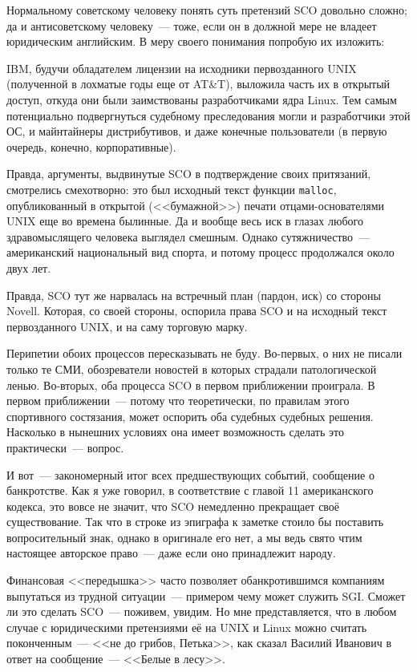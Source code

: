 Нормальному советскому человеку понять суть претензий SCO довольно сложно; да и антисоветскому человеку~--- тоже, если он в должной мере не владеет юридическим английским. В меру своего понимания попробую их изложить:

IBM, будучи обладателем лицензии на исходники первозданного UNIX (полученной в лохматые годы еще от AT\&T), выложила часть их в открытый доступ, откуда они были заимствованы разработчиками ядра Linux. Тем самым потенциально подвергнуться судебному преследования могли и разработчики этой ОС, и майнтайнеры дистрибутивов, и даже конечные пользователи (в первую очередь, конечно, корпоративные).

Правда, аргументы, выдвинутые SCO в подтверждение своих притязаний, смотрелись смехотворно: это был исходный текст функции \texttt{malloc}, опубликованный в открытой (<<бумажной>>) печати отцами-основателями UNIX еще во времена былинные. Да и вообще весь иск в глазах любого здравомыслящего человека выглядел смешным. Однако сутяжничество~--- американский национальный вид спорта, и потому процесс продолжался около двух лет.

Правда, SCO тут же нарвалась на встречный план (пардон, иск) со стороны Novell. Которая, со своей стороны, оспорила права SCO и на исходный текст первозданного UNIX, и на саму торговую марку.

Перипетии обоих процессов пересказывать не буду. Во-первых, о них не писали только те СМИ, обозреватели новостей в которых страдали патологической ленью. Во-вторых, оба процесса SCO в первом приближении проиграла. В первом приближении~--- потому что теоретически, по правилам этого спортивного состязания, может оспорить оба судебных судебных решения. Насколько в нынешних условиях она имеет возможность сделать это практически~--- вопрос.

И вот~--- закономерный итог всех предшествующих событий, сообщение о банкротстве. Как я уже говорил, в соответствие с главой 11 американского кодекса, это вовсе не значит, что SCO немедленно прекращает своё существование. Так что в строке из эпиграфа к заметке стоило бы поставить вопросительный знак, однако в оригинале его нет, а мы ведь свято чтим настоящее авторское право~--- даже если оно принадлежит народу.

Финансовая <<передышка>> часто позволяет обанкротившимся компаниям выпутаться из трудной ситуации~--- примером чему может служить SGI. Сможет ли это сделать SCO~--- поживем, увидим. Но мне представляется, что в любом случае с юридическими претензиями её на UNIX и Linux можно считать поконченным~--- <<не до грибов, Петька>>, как сказал Василий Иванович в ответ на сообщение~--- <<Белые в лесу>>.


